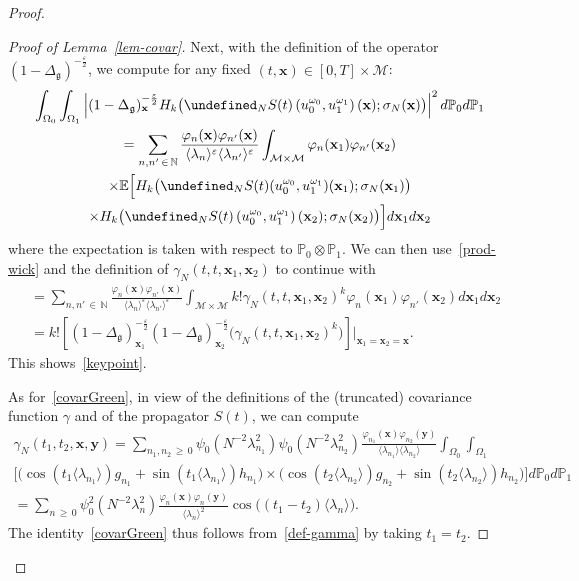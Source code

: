 \documentclass[10pt]{amsart}
\theoremstyle{definition}\newtheorem{defi}[theo]{Definition}\newtheorem{rema}[theo]{Remark}\newtheorem{exam}[theo]{Example}\newtheorem{exem}[theo]{Example}\newtheorem{nota}[theo]{Notation}
\newcommand{\E}{\mathbb{E}}
\newcommand{\Prob}{\mathbb{P}}
\newcommand{\N}{\mathbb{N}}
\let\P= \undefined
\newcommand{\P}{\mathbf{P}}
\newcommand{\x}{\mathbf{x}}
\newcommand{\y}{\mathbf{y}}
\newcommand{\M}{\mathcal{M}}
\newcommand{\g}{\mathfrak{g}}
\newcommand{\Dlg}{\Delta_{\g}}
\newcommand{\eps}{\varepsilon}
\newcommand{\s}{\sigma}
\renewcommand{\o}{\omega}
\renewcommand{\O}{\Omega}
\newcommand{\jb}[1] {\langle #1 \rangle}
\begin{document}
\begin{proof}
\begin{proof}[Proof of Lemma~\ref{lem-covar}]
Next, with the definition of the operator $(1-\Dlg)^{-\frac\eps2}$, we compute for any fixed $(t,\x)\in [0,T]\times\M$:
\begin{multline*}
\int_{\O_0}\int_{\O_1}\left|(1-\Dlg)_\x^{-\frac\eps2}H_k\big(\P_NS(t)\left(u_0^{\o_0},u_1^{\o_1}\right)(\x);\s_N(\x)\big)\right|^2d\Prob_0d\Prob_1\\
= \sum_{n,n'\,\in\,\N}\frac{\varphi_n(\x)\varphi_{n'}(\x)}{\jb{\lambda_n}^{\eps}\jb{\lambda_{n'}}^{\eps}}\int_{\M\times\M}\varphi_n(\x_1)\varphi_{n'}(\x_2)\\
\times\E\Big[H_k\big(\P_NS(t)(u_0^{\o_0},u_1^{\o_1})(\x_1);\s_N(\x_1)\big)\\
\times H_k\big(\P_NS(t)\left(u_0^{\o_0},u_1^{\o_1}\right)(\x_2);\s_N(\x_2)\big)\Big]d\x_1d\x_2
\end{multline*}
where the expectation is taken with respect to $\Prob_0\otimes\Prob_1$. We can then use~\eqref{prod-wick} and the definition of $\gamma_N(t,t,\x_1,\x_2)$ to continue with
\begin{align*}
&= \sum_{n,n'\,\in\,\N}\frac{\varphi_n(\x)\varphi_{n'}(\x)}{\jb{\lambda_n}^{\eps}\jb{\lambda_{n'}}^{\eps}}\int_{\M\times\M}k! \gamma_N(t,t,\x_1,\x_2)^k\varphi_n(\x_1)\varphi_{n'}(\x_2)d\x_1 d\x_2\\
&=k!\left[(1-\Dlg)_{\x_1}^{-\frac\eps2}(1-\Dlg)_{\x_2}^{-\frac\eps2}\big(\gamma_N(t,t,\x_1,\x_2)^k\big)\right]\Big|_{\x_1=\x_2=\x}.
\end{align*}
This shows~\eqref{keypoint}.

As for~\eqref{covarGreen}, in view of the definitions of the (truncated) covariance function $\gamma$ and of the propagator $S(t)$, we can compute
\begin{multline}\label{def-gamma}
\gamma_N\left(t_1,t_2,\x,\y\right)
=\sum_{n_1,n_2\,\ge\,0}\psi_0\left(N^{-2}\lambda_{n_1}^2\right)\psi_0\left(N^{-2}\lambda_{n_2}^2\right)\frac{\varphi_{n_1}(\x)\varphi_{n_2}(\y)}{\jb{\lambda_{n_1}}\jb{\lambda_{n_2}}} \int_{\O_0}\int_{\O_1}\\\Big[\big(\cos(t_1\jb{\lambda_{n_1}})g_{n_1}+\sin(t_1\jb{\lambda_{n_1}})h_{n_1}\big)
\times\big(\cos(t_2\jb{\lambda_{n_2}})g_{n_2}+\sin\left(t_2\jb{\lambda_{n_2}}\right)h_{n_2}\big)\Big]d\Prob_0d\Prob_1\\
=\sum_{n\,\ge\,0}\psi_0^2(N^{-2}\lambda_{n}^2)\frac{\varphi_{n}(\x)\varphi_{n}(\y)}{\jb{\lambda_{n}}^2}\cos\big((t_1-t_2)\jb{\lambda_{n}}\big).
\end{multline}
The identity~\eqref{covarGreen} thus follows from~\eqref{def-gamma} by taking $t_1=t_2$.
\end{proof}


\end{proof}
\end{document}
